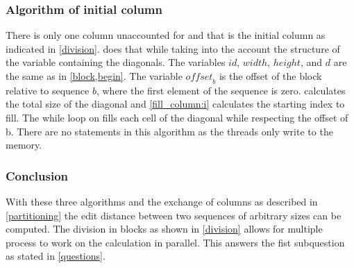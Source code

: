 \subsubsection{Algorithm of initial column}
There is only one column unaccounted for and that is the initial column as indicated in \cref{division}.
 does that while taking into the account the structure of the variable containing the diagonals.
The variables $id$, $width$, $height$, and $d$ are the same as in \cref{block,begin}.
The variable $\mathit{offset}_b$ is the offset of the block relative to sequence $b$, where the first element of the sequence is zero.
 calculates the total size of the diagonal and \cref{fill_column:i} calculates the starting index to fill.
The while loop on  fills each cell of the diagonal while respecting the offset of b.
There are no  statements in this algorithm as the threads only write to the memory.

\subsubsection{Conclusion}
With these three algorithms and the exchange of columns as described in \cref{partitioning} the edit distance between two sequences of arbitrary sizes can be computed.
The division in blocks as shown in \cref{division} allows for multiple process to work on the calculation in parallel.
This answers the fist subquestion as stated in \cref{questions}.

